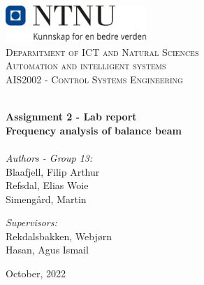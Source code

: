 
\begin{titlepage}
\vbox{ }
\vbox{ }
\begin{center}
\includegraphics[width=0.40\textwidth]{Code/Images/NTNU_logo.png} \\[1cm]
\textsc{\LARGE Deparmtment of ICT and Natural Sciences}\\[1.5cm]
\textsc{\LARGE Automation and intelligent systems}\\ [1.5cm]
\textsc{\Large AIS2002 - Control Systems Engineering}\\[0.5cm]
\vbox{ }

\HRule \\[0.4cm]

{ \huge \bfseries Assignment 2 - Lab report}\\[0.4cm]
{ \large \bfseries Frequency analysis of balance beam}\\[0.4cm]
\HRule \\[1.5cm]

\large
\emph{Authors - Group 13:}\\[0.2cm]
Blaafjell, Filip Arthur\\[0.1cm]
Refsdal, Elias Woie\\[0.1cm]
Simengård, Martin\\
\vfill

\large
\emph{Supervisors:}\\ [0.2cm]
Rekdalsbakken, Webjørn\\[0.1cm]
Hasan, Agus Ismail \\[0.1cm]
\vfill




{\large October, 2022}
\end{center}
\end{titlepage}